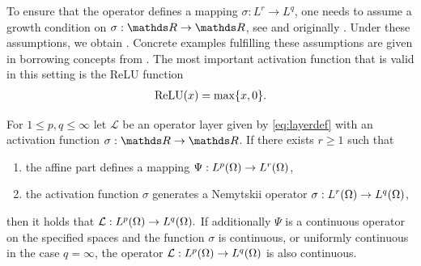 To ensure that the \Nem{} operator defines a mapping $\sigma:L^r\to L^q$, one needs to assume a growth condition on $\sigma:\R\to\R$, see \cite[Eq. 4]{kabri2023resolution} and originally \cite{tröltzsch}. Under these assumptions, we obtain \cite[Prop. 1]{kabri2023resolution}. Concrete examples fulfilling these assumptions are given in \cite{kabri2023resolution} borrowing concepts from \cite{ambrosetti, tröltzsch}. The most important activation function that is valid in this setting is the ReLU function
%
\begin{align*}
\operatorname{ReLU}(x) = \max\{x, 0\}.
\end{align*}
%
%
\begin{proposition}{\cite[Prop. 1]{kabri2023resolution}}{}
	For $1 \leq p, q \leq \infty$ let $\mathcal{L}$ be an operator layer given by \eqref{eq:layerdef} with an activation function $\sigma: \R \rightarrow \R$.
	If there exists $r \geq 1$ such that
	\begin{enumerate}[label=(\roman*)]
		\item the affine part defines a mapping $\Psi: L^p(\Omega) \rightarrow L^r(\Omega)$,
		\item the activation function $\sigma$ generates a Nemytskii operator $\sigma: L^r(\Omega) \rightarrow L^q(\Omega)$,
	\end{enumerate}
	then it holds that
	$
	\mathcal{L}: L^p(\Omega) \rightarrow L^q(\Omega).
	$
	If additionally $\Psi$ is a continuous operator on the specified spaces and the function $\sigma$ is continuous, or uniformly continuous in the case $q=\infty$, the operator $\mathcal{L}: L^p(\Omega) \rightarrow L^q(\Omega)$ is also continuous.
\end{proposition}
%
%
